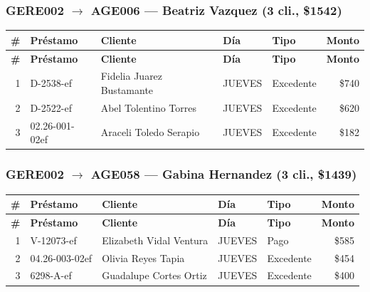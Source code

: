 \documentclass[11pt,a4paper]{article}
\newcommand{\money}[1]{\$\num{#1}}
\begin{document}
\subsubsection{GERE002 $\rightarrow$ AGE006 --- Beatriz Vazquez (3 cli., \money{1542})}


\begin{center}
\renewcommand{\arraystretch}{1.1}
\footnotesize
\begin{longtable}{rlp{5.5cm}llr}
\toprule
\textbf{\#} & \textbf{Pr\'estamo} & \textbf{Cliente} & \textbf{D\'ia} & \textbf{Tipo} & \textbf{Monto} \\
\midrule
\endfirsthead
\toprule
\textbf{\#} & \textbf{Pr\'estamo} & \textbf{Cliente} & \textbf{D\'ia} & \textbf{Tipo} & \textbf{Monto} \\
\midrule
\endhead
1 & D-2538-ef & Fidelia Juarez Bustamante & JUEVES & Excedente & \money{740} \\
2 & D-2522-ef & Abel Tolentino Torres & JUEVES & Excedente & \money{620} \\
3 & 02.26-001-02ef & Araceli Toledo Serapio & JUEVES & Excedente & \money{182} \\

\bottomrule
\end{longtable}
\end{center}
\subsubsection{GERE002 $\rightarrow$ AGE058 --- Gabina Hernandez (3 cli., \money{1439})}


\begin{center}
\renewcommand{\arraystretch}{1.1}
\footnotesize
\begin{longtable}{rlp{5.5cm}llr}
\toprule
\textbf{\#} & \textbf{Pr\'estamo} & \textbf{Cliente} & \textbf{D\'ia} & \textbf{Tipo} & \textbf{Monto} \\
\midrule
\endfirsthead
\toprule
\textbf{\#} & \textbf{Pr\'estamo} & \textbf{Cliente} & \textbf{D\'ia} & \textbf{Tipo} & \textbf{Monto} \\
\midrule
\endhead
1 & V-12073-ef & Elizabeth Vidal Ventura & JUEVES & Pago & \money{585} \\
2 & 04.26-003-02ef & Olivia Reyes Tapia & JUEVES & Excedente & \money{454} \\
3 & 6298-A-ef & Guadalupe Cortes Ortiz & JUEVES & Excedente & \money{400} \\

\bottomrule
\end{longtable}
\end{center}
\end{document}
